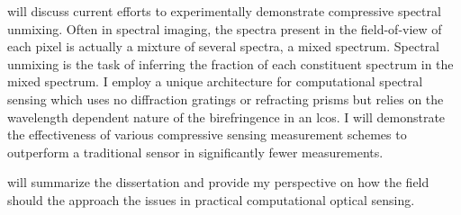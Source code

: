  will discuss current efforts to experimentally demonstrate compressive spectral unmixing. Often in spectral imaging, the spectra present in the field-of-view of each pixel is actually a mixture of several spectra, a mixed spectrum. Spectral unmixing is the task of inferring the fraction of each constituent spectrum in the mixed spectrum. I employ a unique architecture for computational spectral sensing which uses no diffraction gratings or refracting prisms but relies on the wavelength dependent nature of the birefringence in an \gls{lcos}. I will demonstrate the effectiveness of various compressive sensing measurement schemes to outperform a traditional sensor in significantly fewer measurements. 

 will summarize the dissertation and provide my perspective on how the field should the approach the issues in practical computational optical sensing.


%  
%

